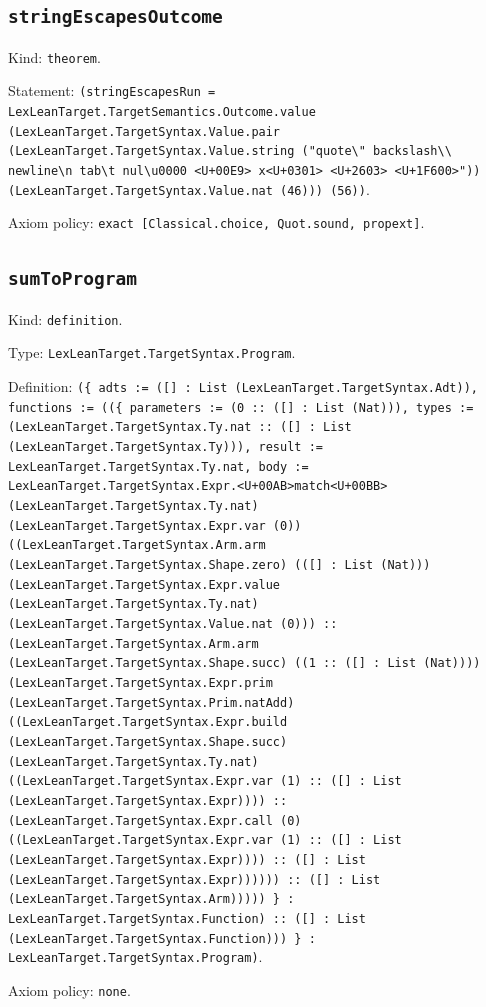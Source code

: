 \documentclass[11pt]{article}
\begin{document}
\subsection*{\texttt{stringEscapesOutcome}}
\noindent Kind: \texttt{theorem}.\par
\noindent Statement: \texttt{(stringEscapesRun = LexLeanTarget.TargetSemantics.Outcome.value (LexLeanTarget.TargetSyntax.Value.pair (LexLeanTarget.TargetSyntax.Value.string ("quote\textbackslash{}" backslash\textbackslash{}\textbackslash{} newline\textbackslash{}n tab\textbackslash{}t nul\textbackslash{}u0000 <U+00E9> x<U+0301> <U+2603> <U+1F600>")) (LexLeanTarget.TargetSyntax.Value.nat (46))) (56))}.\par
\noindent Axiom policy: \texttt{exact [Classical.choice, Quot.sound, propext]}.\par
\subsection*{\texttt{sumToProgram}}
\noindent Kind: \texttt{definition}.\par
\noindent Type: \texttt{LexLeanTarget.TargetSyntax.Program}.\par
\noindent Definition: \texttt{(\{ adts := ([] : List (LexLeanTarget.TargetSyntax.Adt)), functions := ((\{ parameters := (0 :: ([] : List (Nat))), types := (LexLeanTarget.TargetSyntax.Ty.nat :: ([] : List (LexLeanTarget.TargetSyntax.Ty))), result := LexLeanTarget.TargetSyntax.Ty.nat, body := LexLeanTarget.TargetSyntax.Expr.<U+00AB>match<U+00BB> (LexLeanTarget.TargetSyntax.Ty.nat) (LexLeanTarget.TargetSyntax.Expr.var (0)) ((LexLeanTarget.TargetSyntax.Arm.arm (LexLeanTarget.TargetSyntax.Shape.zero) (([] : List (Nat))) (LexLeanTarget.TargetSyntax.Expr.value (LexLeanTarget.TargetSyntax.Ty.nat) (LexLeanTarget.TargetSyntax.Value.nat (0))) :: (LexLeanTarget.TargetSyntax.Arm.arm (LexLeanTarget.TargetSyntax.Shape.succ) ((1 :: ([] : List (Nat)))) (LexLeanTarget.TargetSyntax.Expr.prim (LexLeanTarget.TargetSyntax.Prim.natAdd) ((LexLeanTarget.TargetSyntax.Expr.build (LexLeanTarget.TargetSyntax.Shape.succ) (LexLeanTarget.TargetSyntax.Ty.nat) ((LexLeanTarget.TargetSyntax.Expr.var (1) :: ([] : List (LexLeanTarget.TargetSyntax.Expr)))) :: (LexLeanTarget.TargetSyntax.Expr.call (0) ((LexLeanTarget.TargetSyntax.Expr.var (1) :: ([] : List (LexLeanTarget.TargetSyntax.Expr)))) :: ([] : List (LexLeanTarget.TargetSyntax.Expr)))))) :: ([] : List (LexLeanTarget.TargetSyntax.Arm))))) \} : LexLeanTarget.TargetSyntax.Function) :: ([] : List (LexLeanTarget.TargetSyntax.Function))) \} : LexLeanTarget.TargetSyntax.Program)}.\par
\noindent Axiom policy: \texttt{none}.\par
\end{document}
